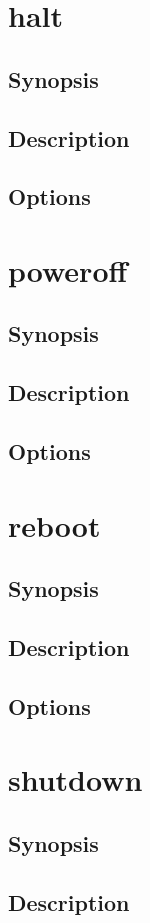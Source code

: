 \documentclass[a4paper, 10pt, onecolumn, openright, oneside]{book}
\begin{document}
		\section{halt}
			\subsection{Synopsis}
			\subsection{Description}
			\subsection{Options}
		\section{poweroff}
			\subsection{Synopsis}
			\subsection{Description}
			\subsection{Options}
		\section{reboot}
			\subsection{Synopsis}
			\subsection{Description}
			\subsection{Options}
		\section{shutdown}
			\subsection{Synopsis}
			\subsection{Description}
\end{document}
